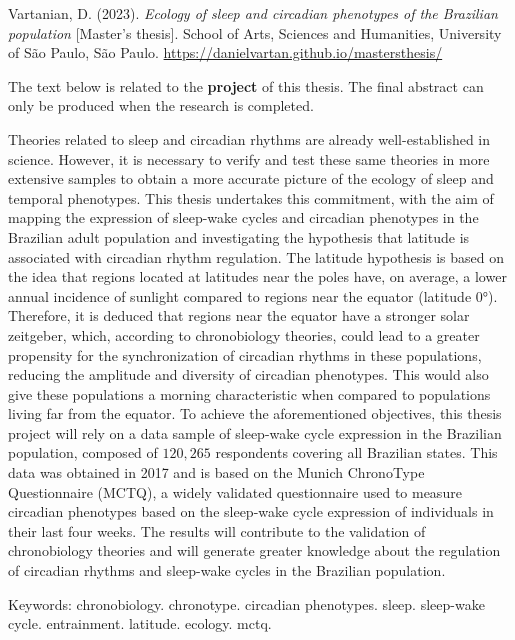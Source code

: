 \documentclass[
  12pt,
  a4paper,
  oneside]{tesesusp}
\begin{document}
\setlength{\absparsep}{18pt}
\begin{resumo}
Vartanian, D. (2023). \emph{Ecology of sleep and circadian phenotypes of
the Brazilian population} {[}Master's thesis{]}. School of Arts,
Sciences and Humanities, University of São Paulo, São Paulo.
\url{https://danielvartan.github.io/mastersthesis/}

The text below is related to the \textbf{project} of this thesis. The
final abstract can only be produced when the research is completed.

Theories related to sleep and circadian rhythms are already
well-established in science. However, it is necessary to verify and test
these same theories in more extensive samples to obtain a more accurate
picture of the ecology of sleep and temporal phenotypes. This thesis
undertakes this commitment, with the aim of mapping the expression of
sleep-wake cycles and circadian phenotypes in the Brazilian adult
population and investigating the hypothesis that latitude is associated
with circadian rhythm regulation. The latitude hypothesis is based on
the idea that regions located at latitudes near the poles have, on
average, a lower annual incidence of sunlight compared to regions near
the equator (latitude 0°). Therefore, it is deduced that regions near
the equator have a stronger solar zeitgeber, which, according to
chronobiology theories, could lead to a greater propensity for the
synchronization of circadian rhythms in these populations, reducing the
amplitude and diversity of circadian phenotypes. This would also give
these populations a morning characteristic when compared to populations
living far from the equator. To achieve the aforementioned objectives,
this thesis project will rely on a data sample of sleep-wake cycle
expression in the Brazilian population, composed of \(120,265\)
respondents covering all Brazilian states. This data was obtained in
2017 and is based on the Munich ChronoType Questionnaire (MCTQ), a
widely validated questionnaire used to measure circadian phenotypes
based on the sleep-wake cycle expression of individuals in their last
four weeks. The results will contribute to the validation of
chronobiology theories and will generate greater knowledge about the
regulation of circadian rhythms and sleep-wake cycles in the Brazilian
population.

Keywords: chronobiology. chronotype. circadian phenotypes. sleep.
sleep-wake cycle. entrainment. latitude. ecology. mctq.
\end{resumo}
\end{document}
